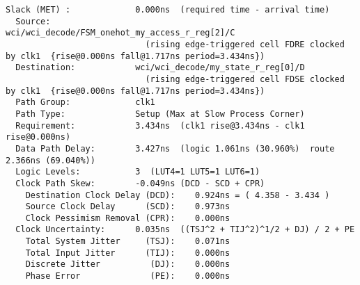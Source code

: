 \documentclass{article}
\begin{document}
\begin{lstlisting}
Slack (MET) :             0.000ns  (required time - arrival time)
  Source:                 wci/wci_decode/FSM_onehot_my_access_r_reg[2]/C
                            (rising edge-triggered cell FDRE clocked by clk1  {rise@0.000ns fall@1.717ns period=3.434ns})
  Destination:            wci/wci_decode/my_state_r_reg[0]/D
                            (rising edge-triggered cell FDSE clocked by clk1  {rise@0.000ns fall@1.717ns period=3.434ns})
  Path Group:             clk1
  Path Type:              Setup (Max at Slow Process Corner)
  Requirement:            3.434ns  (clk1 rise@3.434ns - clk1 rise@0.000ns)
  Data Path Delay:        3.427ns  (logic 1.061ns (30.960%)  route 2.366ns (69.040%))
  Logic Levels:           3  (LUT4=1 LUT5=1 LUT6=1)
  Clock Path Skew:        -0.049ns (DCD - SCD + CPR)
    Destination Clock Delay (DCD):    0.924ns = ( 4.358 - 3.434 ) 
    Source Clock Delay      (SCD):    0.973ns
    Clock Pessimism Removal (CPR):    0.000ns
  Clock Uncertainty:      0.035ns  ((TSJ^2 + TIJ^2)^1/2 + DJ) / 2 + PE
    Total System Jitter     (TSJ):    0.071ns
    Total Input Jitter      (TIJ):    0.000ns
    Discrete Jitter          (DJ):    0.000ns
    Phase Error              (PE):    0.000ns


\end{lstlisting}
\end{document}
